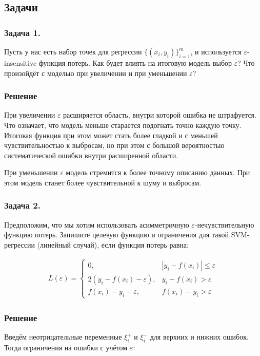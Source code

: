 \subsection*{Задачи}

\subsubsection*{Задача 1.}
Пусть у нас есть набор точек для регрессии \(\{(x_i, y_i)\}_{i=1}^m\), и используется \(\varepsilon\)-insensitive функция потерь. Как будет влиять на итоговую модель выбор \(\varepsilon\)? Что произойдёт с моделью при увеличении и при уменьшении \(\varepsilon\)?

\subsubsection*{Решение}
При увеличении \(\varepsilon\) расширяется область, внутри которой ошибка не штрафуется. Что означает, что модель меньше старается подогнать точно каждую точку. Итоговая функция при этом может стать более гладкой и с меньшей чувствительностью к выбросам, но при этом с большой вероятностью систематической ошибки внутри расширенной области.

При уменьшении \(\varepsilon\) модель стремится к более точному описанию данных. При этом модель станет более чувствительной к шуму и выбросам.

\subsubsection{Задача 2.}
Предположим, что мы хотим использовать асимметричную \(\varepsilon\)-нечувствительную функцию потерь. Запишите целевую функцию и ограничения для такой SVM-регрессии (линейный случай), если функция потерь равна:

\begin{align*}
    L(\varepsilon) =
    \begin{cases}
        0,                             & | y_i - f(x_i) | \leq \varepsilon \\
        2(y_i - f(x_i) - \varepsilon), & y_i - f(x_i) > \varepsilon        \\
        f(x_i) - y_i- \varepsilon,     & f(x_i) - y_i > \varepsilon
    \end{cases}
\end{align*}

\subsubsection{Решение}
Введём неотрицательные переменные \(\xi_i^+\) и \(\xi_i^-\) для верхних и нижних ошибок. Тогда ограничения на ошибки с учётом \(\varepsilon\):

